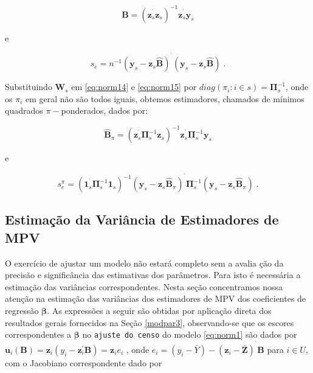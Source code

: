\documentclass[]{book}
\begin{document}
\begin{equation}
\widehat{\mathbf{B}}=\left( \mathbf{z}_{s}^{^{\prime }}\mathbf{z}_{s}\right)
^{-1}\mathbf{z}_{s}^{^{\prime }}\mathbf{y}_{s}  \label{eq:norm16}
\end{equation}

e

\begin{equation}
s_{e}=n^{-1}\left( \mathbf{y}_{s}-\mathbf{z}_{s}\widehat{\mathbf{B}}\right)
^{^{\prime }}\left( \mathbf{y}_{s}-\mathbf{z}_{s}\widehat{\mathbf{B}}\right)
\;.  \label{eq:norm17}
\end{equation}

Substituindo \(\mathbf{W}_{s}\) em \eqref{eq:norm14} e \eqref{eq:norm15} por
\(diag\left( \pi _{i}:i\in s\right) =\mathbf{\Pi }_{s}^{-1}\), onde os
\(\pi _{i}\) em geral não são todos iguais, obtemos estimadores,
chamados de mínimos quadrados \(\pi -\)ponderados, dados por:

\begin{equation}
\widehat{\mathbf{B}}_{\pi }=\left( \mathbf{z}_{s}^{^{\prime }}\mathbf{\Pi }
_{s}^{-1}\mathbf{z}_{s}\right) ^{-1}\mathbf{z}_{s}^{^{\prime }}\mathbf{\Pi }
_{s}^{-1}\mathbf{y}_{s}  \label{eq:norm18}
\end{equation}

e

\begin{equation}
s_{e}^{\pi }=\left( \mathbf{1}_{s}^{^{\prime }}\mathbf{\Pi }_{s}^{-1}\mathbf{
1}_{s}\right) ^{-1}\left( \mathbf{y}_{s}-\mathbf{z}_{s}\widehat{\mathbf{B}}
_{\pi }\right) ^{^{\prime }}\mathbf{\Pi }_{s}^{-1}\left( \mathbf{y}_{s}-
\mathbf{z}_{s}\widehat{\mathbf{B}}_{\pi }\right) \;.  \label{eq:norm19}
\end{equation}

\subsection{Estimação da Variância de Estimadores de
MPV}\label{estimacao-da-variancia-de-estimadores-de-mpv}

O exercício de ajustar um modelo não estará completo sem a avalia ção da
precisão e significância das estimativas dos parâmetros. Para isto é
necessária a estimação das variâncias correspondentes. Nesta seção
concentramos nossa atenção na estimação das variâncias dos estimadores
de MPV dos coeficientes de regressão \(\mathbf{\beta }\). As expressões
a seguir são obtidas por aplicação direta dos resultados gerais
fornecidos na Seção \ref{modpar3}, observando-se que os escores
correspondentes a \(\mathbf{\beta}\) no \texttt{ajuste\ do\ censo} do
modelo \eqref{eq:norm1} são dados por
\(\mathbf{u}_{i}\left( \mathbf{B}\right) =\mathbf{z}_{i}\left( y_{i}-\mathbf{z}_{i}^{\prime }\mathbf{B}\right) =\mathbf{z} _{i}e_{i}\)
, onde
\(e_{i}=\left( y_{i}-\bar{Y}\right) -\left( \mathbf{z}_{i}-\mathbf{\bar{Z}}\right) ^{^{\prime }}\mathbf{B}\)
para \(i\in U\), com o Jacobiano correspondente dado por
\end{document}

